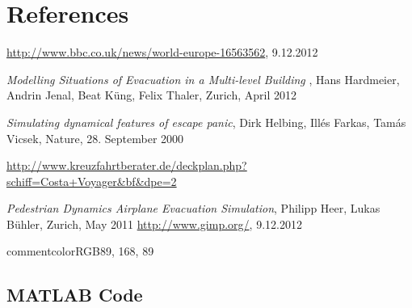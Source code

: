 \documentclass[11pt]{article}
\begin{document}
\newpage
\section{References}



\begingroup 
\renewcommand{\section}[2]{}%
\begin{thebibliography}{9}

		\url{http://www.bbc.co.uk/news/world-europe-16563562}, 9.12.2012

	\emph{Modelling Situations of Evacuation
in a Multi-level Building} , 
Hans Hardmeier, Andrin Jenal, Beat K\"ung, Felix Thaler, Zurich, April 2012

		\emph{Simulating dynamical features of escape panic},
		Dirk Helbing, Ill\'es Farkas, Tam\'as Vicsek, Nature, 28. September 2000

		\url{http://www.kreuzfahrtberater.de/deckplan.php?schiff=Costa+Voyager&bf&dpe=2}

		\emph{Pedestrian Dynamics Airplane Evacuation Simulation},
		Philipp Heer, Lukas Bühler, Zurich, May 2011
		\url{http://www.gimp.org/}, 9.12.2012
\end{thebibliography}
\endgroup

\newpage
\section{Appendix}

\definecolor{commentcolor}{RGB}{89, 168, 89}

\subsection{MATLAB Code}
\end{document}
